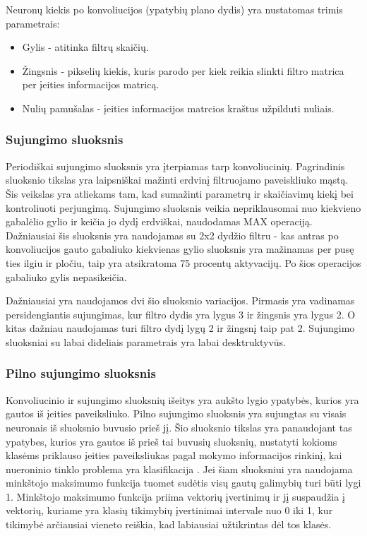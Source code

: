 \documentclass{VUMIFPSkursinis}
\begin{document}
Neuronų kiekis po konvoliucijos (ypatybių plano dydis) yra nustatomas trimis parametrais:
\begin{itemize}
\item Gylis - atitinka filtrų skaičių.
\item Žingsnis - pikselių kiekis, kuris parodo per kiek reikia slinkti filtro matrica per įeities informacijos matricą.
\item Nulių pamušalas - įeities informacijos matrcios kraštus užpilduti nuliais.
\end{itemize}

\subsubsection{Sujungimo sluoksnis}
Periodiškai sujungimo sluoksnis yra įterpiamas tarp konvoliucinių. Pagrindinis sluoksnio tikslas yra laipsniškai mažinti erdvinį filtruojamo paveiskliuko mąstą.
Šis veikslas yra atliekams tam, kad sumažinti parametrų ir skaičiavimų kiekį bei kontroliuoti perjungimą. Sujungimo sluoksnis veikia nepriklausomai nuo kiekvieno
gabalėlio gylio ir keičia jo dydį erdviškai, naudodamas MAX operaciją. Dažniausiai šis sluoksnis yra naudojamas su 2x2 dydžio filtru - kas antras po konvoliucijos 
gauto gabaliuko kiekvienas gylio sluoksnis yra mažinamas per pusę ties ilgiu ir pločiu, taip yra atsikratoma 75 procentų aktyvacijų. Po šios operacijos gabaliuko 
gylis nepasikeičia.

Dažniausiai yra naudojamos dvi šio sluoksnio variacijos. Pirmasis yra vadinamas persidengiantis sujungimas, kur filtro dydis yra lygus 3 ir žingsnis yra lygus 2. 
O kitas dažniau naudojamas turi filtro dydį lygų 2 ir žingsnį taip pat 2. Sujungimo sluoksniai su labai dideliais parametrais yra labai desktruktyvūs.

\subsubsection{Pilno sujungimo sluoksnis}
Konvoliucinio ir sujungimo sluoksnių išeitys yra aukšto lygio ypatybės, kurios yra gautos iš įeities paveiksliuko. Pilno sujungimo sluoksnis yra sujungtas su visais 
neuronais iš sluoksnio buvusio prieš jį. Šio sluoksnio tikslas yra panaudojant tas ypatybes, kurios yra gautos iš prieš tai buvusių sluoksnių, nustatyti kokioms 
klasėms priklauso įeities paveiksliukas pagal mokymo informacijos rinkinį, kai nueroninio tinklo problema yra klasifikacija \cite{layers-fullyconnected}. Jei šiam sluoksniui yra naudojama 
minkštojo maksimumo funkcija tuomet sudėtis visų gautų galimybių turi būti lygi 1. Minkštojo maksimumo funkcija priima vektorių įvertinimų ir jį suspaudžia į 
vektorių, kuriame yra klasių tikimybių įvertinimai intervale nuo 0 iki 1, kur tikimybė arčiausiai vieneto reiškia, kad labiausiai užtikrintas dėl tos klasės.
\end{document}

